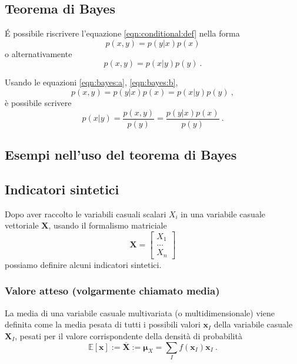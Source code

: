 \subsection{Teorema di Bayes}
\'E possibile riscrivere l'equazione \ref{eqn:conditional:def} nella forma
\begin{equation}\label{eqn:bayes:a}
    p(x,y) = p(y|x) p(x)
\end{equation}
o alternativamente
\begin{equation}\label{eqn:bayes:b}
   p(x,y) = p(x|y) p(y) \ .
\end{equation}
\begin{theorem}
    Usando le equazioni \ref{eqn:bayes:a}, \ref{eqn:bayes:b},
    \begin{equation}
        p(x,y) = p(y|x) p(x) = p(x|y) p(y) \ ,
    \end{equation}
    è possibile scrivere
    \begin{equation}
        p(x|y) = \dfrac{ p(x,y) }{ p(y) } = \dfrac{ p(y|x) p(x) }{ p(y) } \ .
    \end{equation}
\end{theorem}

\subsection{Esempi nell'uso del teorema di Bayes}

\subsection{Indicatori sintetici}
Dopo aver raccolto le variabili casuali scalari $X_i$ in una variabile casuale vettoriale $\mathbf{X}$, usando il formalismo matriciale
\begin{equation}
    \mathbf{X} = \begin{bmatrix}  X_1 \\ \dots  \\ X_n \end{bmatrix}
\end{equation}
possiamo definire alcuni indicatori sintetici. 

\subsubsection{Valore atteso (volgarmente chiamato media)}
La media di una variabile casuale multivariata (o multidimensionale) viene definita come la media pesata di tutti i possibili valori $\mathbf{x}_I$ della variabile casuale $\mathbf{X}_I$, pesati per il valore corrispondente della densità di probabilità
\begin{equation}
    \mathbb{E}[\mathbf{x}] := \overline{\mathbf{X}} := \mathbf{\mu}_X = \sum_{I} f(\mathbf{x}_I) \mathbf{x}_I \ . 
\end{equation}


